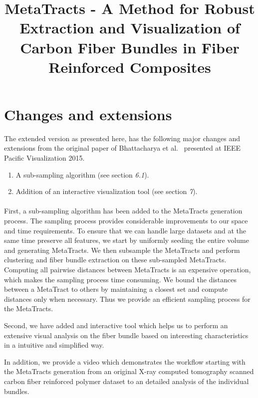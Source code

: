 \documentclass[]{article}
\title{MetaTracts - A Method for Robust Extraction and Visualization of Carbon Fiber Bundles in Fiber Reinforced Composites}
\begin{document}
\maketitle

\section{Changes and extensions}
The extended version as presented here, has the following major changes and extensions from the original paper of Bhattacharya et al.~\cite{Bhattacharya2015}  presented at IEEE Pacific Visualization 2015.
\begin{enumerate}
	\item A sub-sampling algorithm (see section \textit{6.1}).
	\item Addition of an interactive visualization tool (see section \textit{7}).
\end{enumerate}
\paragraph{}
First, a sub-sampling algorithm has been added to the MetaTracts generation process. The sampling process provides considerable improvements to our space and time requirements. 
To ensure that we can handle large datasets and at the same time preserve all features, we start by uniformly seeding the entire volume and generating MetaTracts. We then subsample the MetaTracts and  perform clustering and fiber bundle extraction on these sub-sampled MetaTracts.
Computing all pairwise distances between MetaTracts is an expensive operation, which makes the sampling process time consuming.
We bound the distances between a MetaTract to others by maintaining a closest set and compute distances only when necessary. Thus we provide an efficient sampling process for the MetaTracts.

 
Second, we have added and interactive tool which helps us to perform an extensive  visual analysis on the fiber bundle based on interesting characteristics in a intuitive and simplified way. 

In addition, we provide a video which demonstrates the workflow starting with the MetaTracts generation from an original X-ray computed tomography scanned carbon fiber reinforced polymer dataset to an detailed analysis of the individual bundles. 



\end{document}
